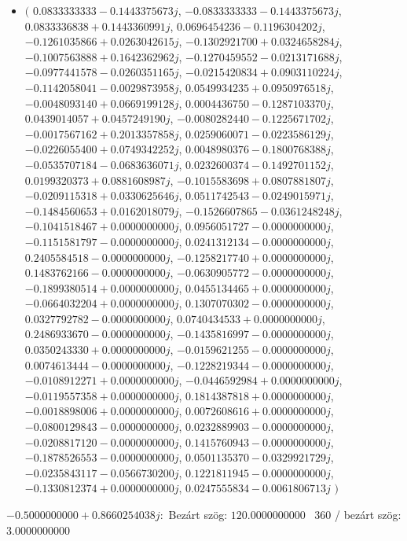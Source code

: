 \documentclass[14pt,a4paper]{article}
\begin{document}
\begin{itemize}
\item
$\big($
$0.0833333333-0.1443375673j$, $-0.0833333333-0.1443375673j$, $0.0833336838+0.1443360991j$, $0.0696454236-0.1196304202j$, $-0.1261035866+0.0263042615j$, $-0.1302921700+0.0324658284j$, $-0.1007563888+0.1642362962j$, $-0.1270459552-0.0213171688j$, $-0.0977441578-0.0260351165j$, $-0.0215420834+0.0903110224j$, $-0.1142058041-0.0029873958j$, $0.0549934235+0.0950976518j$, $-0.0048093140+0.0669199128j$, $0.0004436750-0.1287103370j$, $0.0439014057+0.0457249190j$, $-0.0080282440-0.1225671702j$, $-0.0017567162+0.2013357858j$, $0.0259060071-0.0223586129j$, $-0.0226055400+0.0749342252j$, $0.0048980376-0.1800768388j$, $-0.0535707184-0.0683636071j$, $0.0232600374-0.1492701152j$, $0.0199320373+0.0881608987j$, $-0.1015583698+0.0807881807j$, $-0.0209115318+0.0330625646j$, $0.0511742543-0.0249015971j$, $-0.1484560653+0.0162018079j$, $-0.1526607865-0.0361248248j$, $-0.1041518467+0.0000000000j$, $0.0956051727-0.0000000000j$, $-0.1151581797-0.0000000000j$, $0.0241312134-0.0000000000j$, $0.2405584518-0.0000000000j$, $-0.1258217740+0.0000000000j$, $0.1483762166-0.0000000000j$, $-0.0630905772-0.0000000000j$, $-0.1899380514+0.0000000000j$, $0.0455134465+0.0000000000j$, $-0.0664032204+0.0000000000j$, $0.1307070302-0.0000000000j$, $0.0327792782-0.0000000000j$, $0.0740434533+0.0000000000j$, $0.2486933670-0.0000000000j$, $-0.1435816997-0.0000000000j$, $0.0350243330+0.0000000000j$, $-0.0159621255-0.0000000000j$, $0.0074613444-0.0000000000j$, $-0.1228219344-0.0000000000j$, $-0.0108912271+0.0000000000j$, $-0.0446592984+0.0000000000j$, $-0.0119557358+0.0000000000j$, $0.1814387818+0.0000000000j$, $-0.0018898006+0.0000000000j$, $0.0072608616+0.0000000000j$, $-0.0800129843-0.0000000000j$, $0.0232889903-0.0000000000j$, $-0.0208817120-0.0000000000j$, $0.1415760943-0.0000000000j$, $-0.1878526553-0.0000000000j$, $0.0501135370-0.0329921729j$, $-0.0235843117-0.0566730200j$, $0.1221811945-0.0000000000j$, $-0.1330812374+0.0000000000j$, $0.0247555834-0.0061806713j$
$\big)$
\end{itemize}
$-0.5000000000+0.8660254038j$:\
Bezárt szög: $120.0000000000$ \
360 / bezárt szög: $3.0000000000$\
\end{document}
